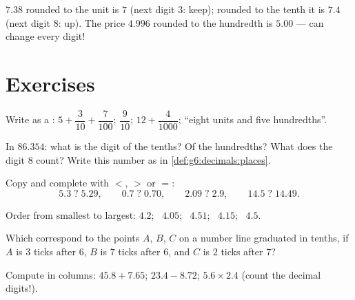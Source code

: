 \begin{example}
$7.38$ rounded to the unit is $7$ (next digit $3$: keep); rounded to
the tenth it is $7.4$ (next digit $8$:  up). The price
$4.996$ rounded to the hundredth is $5.00$ ---  can change
every digit!
\end{example}

\section{Exercises}

\begin{exercise}[$\star$]\label{exo:g6:decimals:1}
Write as a : $5 + \dfrac{3}{10} + \dfrac{7}{100}$;
\quad $\dfrac{9}{10}$; \quad $12 + \dfrac{4}{1000}$;
\quad ``eight units and five hundredths''.
\end{exercise}

\begin{exercise}[$\star$]\label{exo:g6:decimals:2}
In $86.354$: what is the digit of the tenths? Of the hundredths? What
does the digit $8$ count? Write this number as in
\cref{def:g6:decimals:places}.
\end{exercise}

\begin{exercise}[$\star$]\label{exo:g6:decimals:3}
Copy and complete with $<$, $>$ or $=$:
\[
5.3 \;?\; 5.29, \qquad
0.7 \;?\; 0.70, \qquad
2.09 \;?\; 2.9, \qquad
14.5 \;?\; 14.49 .
\]
\end{exercise}

\begin{exercise}[$\star$]\label{exo:g6:decimals:4}
Order from smallest to largest:
$4.2$; \ $4.05$; \ $4.51$; \ $4.15$; \ $4.5$.
\end{exercise}

\begin{exercise}[$\star$]\label{exo:g6:decimals:5}
Which  correspond to the points $A$, $B$, $C$ on a
number line graduated in tenths, if $A$ is $3$ ticks after $6$, $B$ is
$7$ ticks after $6$, and $C$ is $2$ ticks after $7$?
\end{exercise}

\begin{exercise}[$\star$]\label{exo:g6:decimals:6}
Compute in columns: $45.8 + 7.65$; \quad $23.4 - 8.72$; \quad
$5.6 \times 2.4$ (count the decimal digits!).
\end{exercise}

